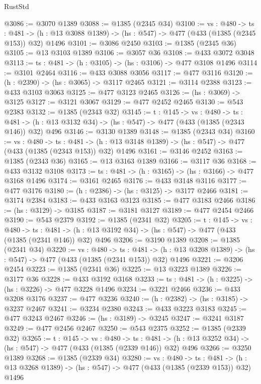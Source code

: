 \begin{lexlean}{RustStd}
\begin{coremodule}
@3086 := @3070 @1389
@3088 := @1385 (@2345 @34)
@3100 := {vs : @480} ->
  {ts : @481} -> (h : @13 @3088 @1389) -> (hs : @547) -> @477 (@433 (@1385 (@2345 @153)) @32) @1496
@3101 := @3086 @2450
@3103 := @1385 (@2345 @36)
@3105 := @13 @3103 @1389
@3106 := @3057 @36
@3108 := @433 @3072 @3048
@3113 := {ts : @481} -> (h : @3105) -> (hs : @3106) -> @477 @3108 @1496
@3114 := @3101 @2464
@3116 := @433 @3088 @3056
@3117 := @477 @3116
@3120 := (h : @2390) -> (hs : @3065) -> @3117 @2465
@3121 := @3114 @2388
@3123 := @433 @3103 @3063
@3125 := @477 @3123 @2465
@3126 := (hs : @3069) -> @3125
@3127 := @3121 @3067
@3129 := @477 @2452 @2465
@3130 := @543 @2383
@3132 := @1385 (@2343 @32)
@3145 := {t : @145} ->
  {vs : @480} ->
  {ts : @481} -> (h : @13 @3132 @34) -> (hs : @547) -> @477 (@433 (@1385 (@2343 @146)) @32) @496
@3146 := @3130 @1389
@3148 := @1385 (@2343 @34)
@3160 := {vs : @480} ->
  {ts : @481} -> (h : @13 @3148 @1389) -> (hs : @547) -> @477 (@433 (@1385 (@2343 @153)) @32) @1496
@3161 := @3146 @2452
@3163 := @1385 (@2343 @36)
@3165 := @13 @3163 @1389
@3166 := @3117 @36
@3168 := @433 @3132 @3108
@3173 := {ts : @481} -> (h : @3165) -> (hs : @3166) -> @477 @3168 @1496
@3174 := @3161 @2465
@3176 := @433 @3148 @3116
@3177 := @477 @3176
@3180 := (h : @2386) -> (hs : @3125) -> @3177 @2466
@3181 := @3174 @2384
@3183 := @433 @3163 @3123
@3185 := @477 @3183 @2466
@3186 := (hs : @3129) -> @3185
@3187 := @3181 @3127
@3189 := @477 @2454 @2466
@3190 := @543 @2379
@3192 := @1385 (@2341 @32)
@3205 := {t : @145} ->
  {vs : @480} ->
  {ts : @481} -> (h : @13 @3192 @34) -> (hs : @547) -> @477 (@433 (@1385 (@2341 @146)) @32) @496
@3206 := @3190 @1389
@3208 := @1385 (@2341 @34)
@3220 := {vs : @480} ->
  {ts : @481} -> (h : @13 @3208 @1389) -> (hs : @547) -> @477 (@433 (@1385 (@2341 @153)) @32) @1496
@3221 := @3206 @2454
@3223 := @1385 (@2341 @36)
@3225 := @13 @3223 @1389
@3226 := @3177 @36
@3228 := @433 @3192 @3168
@3233 := {ts : @481} -> (h : @3225) -> (hs : @3226) -> @477 @3228 @1496
@3234 := @3221 @2466
@3236 := @433 @3208 @3176
@3237 := @477 @3236
@3240 := (h : @2382) -> (hs : @3185) -> @3237 @2467
@3241 := @3234 @2380
@3243 := @433 @3223 @3183
@3245 := @477 @3243 @2467
@3246 := (hs : @3189) -> @3245
@3247 := @3241 @3187
@3249 := @477 @2456 @2467
@3250 := @543 @2375
@3252 := @1385 (@2339 @32)
@3265 := {t : @145} ->
  {vs : @480} ->
  {ts : @481} -> (h : @13 @3252 @34) -> (hs : @547) -> @477 (@433 (@1385 (@2339 @146)) @32) @496
@3266 := @3250 @1389
@3268 := @1385 (@2339 @34)
@3280 := {vs : @480} ->
  {ts : @481} -> (h : @13 @3268 @1389) -> (hs : @547) -> @477 (@433 (@1385 (@2339 @153)) @32) @1496

\end{coremodule}
\end{lexlean}
